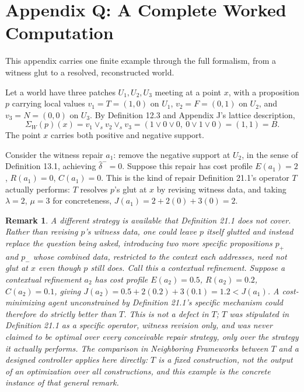 \documentclass[11pt]{book}
\newtheorem*{appendixremark}{Remark}
\begin{document}
\chapter*{Appendix Q: A Complete Worked Computation}

This appendix carries one finite example through the full formalism, from a witness glut to a resolved, reconstructed world.

Let a world have three patches $U_1, U_2, U_3$ meeting at a point $x$, with a proposition $p$ carrying local values $v_1 = T = (1,0)$ on $U_1$, $v_2 = F = (0,1)$ on $U_2$, and $v_3 = N = (0,0)$ on $U_3$. By Definition 12.3 and Appendix J's lattice description,
\[
\Sigma_W(p)(x) = v_1 \vee_s v_2 \vee_s v_3 = (1 \vee 0 \vee 0,\ 0 \vee 1 \vee 0) = (1,1) = B.
\]
The point $x$ carries both positive and negative support.

Consider the witness repair $a_1$: remove the negative support at $U_2$, in the sense of Definition 13.1, achieving $\hat\delta^- = 0$. Suppose this repair has cost profile $E(a_1) = 2$, $R(a_1) = 0$, $C(a_1) = 0$. This is the kind of repair Definition 21.1's operator $T$ actually performs: $T$ resolves $p$'s glut at $x$ by revising witness data, and taking $\lambda = 2$, $\mu = 3$ for concreteness, $J(a_1) = 2 + 2(0) + 3(0) = 2$.

\begin{appendixremark}
A different strategy is available that Definition 21.1 does not cover. Rather than revising $p$'s witness data, one could leave $p$ itself glutted and instead replace the question being asked, introducing two more specific propositions $p_+$ and $p_-$ whose combined data, restricted to the context each addresses, need not glut at $x$ even though $p$ still does. Call this a \emph{contextual refinement}. Suppose a contextual refinement $a_2$ has cost profile $E(a_2) = 0.5$, $R(a_2) = 0.2$, $C(a_2) = 0.1$, giving $J(a_2) = 0.5 + 2(0.2) + 3(0.1) = 1.2 < J(a_1)$. A cost-minimizing agent unconstrained by Definition 21.1's specific mechanism could therefore do strictly better than $T$. This is not a defect in $T$; $T$ was stipulated in Definition 21.1 as a specific operator, witness revision only, and was never claimed to be optimal over every conceivable repair strategy, only over the strategy it actually performs. The comparison in Neighboring Frameworks between $T$ and a designed controller applies here directly: $T$ is a fixed construction, not the output of an optimization over all constructions, and this example is the concrete instance of that general remark.
\end{appendixremark}
\end{document}
